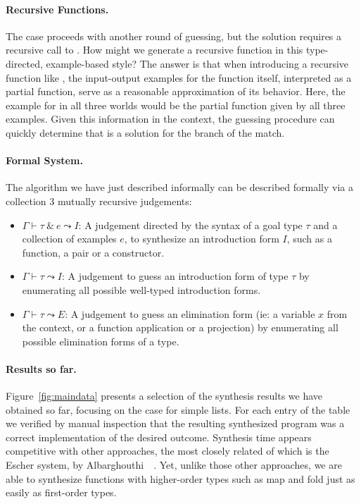 \paragraph{Recursive Functions.}
The  case proceeds with another round of guessing, but the
solution requires a recursive call to .  How might we generate
a recursive function in this type-directed, example-based style?  The
answer is that when introducing a recursive function like , the
input-output examples for the function itself, interpreted as a
partial function, serve as a reasonable approximation of its behavior.
Here, the example for  in all three worlds would be the partial
function given by all three examples.  Given this information in the
context, the guessing procedure can quickly determine that 
 is a solution for the  branch
of the match. 

\paragraph{Formal System.}
The algorithm we have just described informally can be described formally
via a collection 3 mutually recursive judgements:

\begin{itemize}
\item $\Gamma \vdash \tau \ \& \ e \leadsto I$:
A judgement directed by the syntax of a goal type $\tau$ and a
collection of examples $e$, to synthesize
an introduction form $I$, such as a function, a pair or a constructor.
\item $\Gamma \vdash \tau \leadsto I$: A judgement to guess an introduction 
form of type $\tau$ by enumerating all possible well-typed introduction forms.
\item $\Gamma \vdash \tau \leadsto E$:  A judgement to guess an elimination 
form (ie: a variable $x$ from the context, or a function application or
a projection) by enumerating all possible elimination forms of a type.
\end{itemize}
 
\paragraph{Results so far.}  Figure~\ref{fig:maindata} presents a
selection of the synthesis results we have obtained so far, focusing
on the case for simple lists.  For each entry of the table we verified
by manual inspection that the resulting synthesized program was a
correct implementation of the desired outcome.  Synthesis time appears
competitive with other approaches, the most closely related of which
is the Escher system, by Albarghouthi~\etal~\cite{albarghouthi-cav-2013}.  Yet, unlike those
other approaches, we are able to synthesize functions with
higher-order types such as map and fold just as easily as first-order
types.

